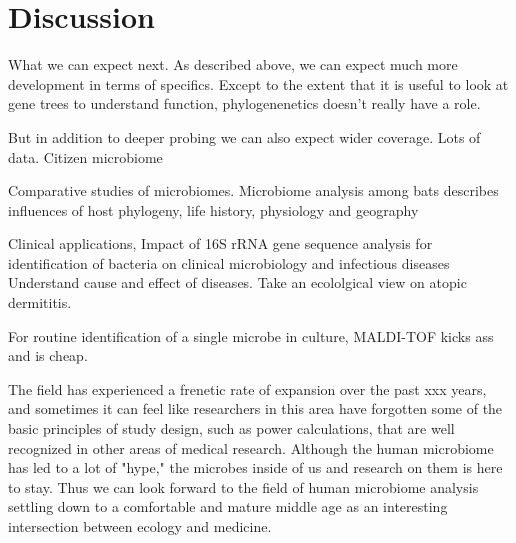 \documentclass{amsart}
\newcommand{\forarxiv}[1]{#1}
\newcommand{\notforarxiv}[1]{}
\newcommand{\FIGmassTransport}{\
\begin{figure}[ht]
\begin{center}
  \forarxiv{\texttt{[image: mass\_transport.pdf]}}
\end{center}
\caption{\
  Caption goes here.
}
\label{FIGmassTransport}
\end{figure}
}
\begin{document}
\section{Discussion}
What we can expect next.
As described above, we can expect much more development in terms of specifics.
\cite{hooper2012interactions}
Except to the extent that it is useful to look at gene trees to understand function, phylogenenetics doesn't really have a role.

But in addition to deeper probing we can also expect wider coverage.
Lots of data.
Citizen microbiome

Comparative studies of microbiomes.
\cite{phillips2012microbiome}
Microbiome analysis among bats describes influences of host phylogeny, life history, physiology and geography

Clinical applications,
\cite{clarridge2004}
{{I}mpact of 16{S} r{RNA} gene sequence analysis for identification of bacteria on clinical microbiology and infectious diseases}
Understand cause and effect of diseases.
Take an ecololgical view on atopic dermititis.



For routine identification of a single microbe in culture, MALDI-TOF kicks ass and is cheap.

The field has experienced a frenetic rate of expansion over the past xxx years, and sometimes it can feel like researchers in this area have forgotten some of the basic principles of study design, such as power calculations, that are well recognized in other areas of medical research.
Although the human microbiome has led to a lot of "hype," the microbes inside of us and research on them is here to stay.
Thus we can look forward to the field of human microbiome analysis settling down to a comfortable and mature middle age as an interesting intersection between ecology and medicine.


\notforarxiv{
\newpage
\section{Figure Legends}
\clearpage

\newpage
}



\end{document}
